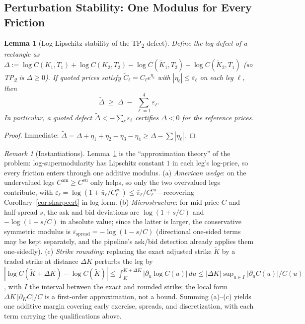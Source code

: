 \documentclass[11pt]{article}
\newtheorem{lemma}{Lemma}
\theoremstyle{remark}
\newtheorem{remark}{Remark}
\newcommand{\Kt}[1]{\tilde K_{#1}}
\begin{document}
\subsection{Perturbation Stability: One Modulus for Every Friction}

\begin{lemma}[Log-Lipschitz stability of the TP\textsubscript{2} defect]\label{lem:stability}
Define the log-defect of a rectangle as $\Delta:=\log C(K_1,T_1)+\log C(K_2,T_2)-\log C(\Kt1,T_2)-\log C(\Kt2,T_1)$ (so TP\textsubscript{2} is $\Delta\ge0$). If quoted prices satisfy $\tilde C_\ell=C_\ell e^{\eta_\ell}$ with $|\eta_\ell|\le\varepsilon_\ell$ on each leg $\ell$, then
\[
\tilde\Delta\;\ge\;\Delta\;-\;\sum_{\ell=1}^4\varepsilon_\ell .
\]
In particular, a quoted defect $\tilde\Delta<-\sum_\ell\varepsilon_\ell$ certifies $\Delta<0$ for the reference prices.
\end{lemma}
\begin{proof}
Immediate: $\tilde\Delta=\Delta+\eta_1+\eta_2-\eta_3-\eta_4\ge\Delta-\sum|\eta_\ell|$.
\end{proof}

\begin{remark}[Instantiations]\label{rem:instantiations}
Lemma~\ref{lem:stability} is the ``approximation theory'' of the problem: log-supermodularity has Lipschitz constant $1$ in each leg's log-price, so every friction enters through one additive modulus. (a) \emph{American wedge}: on the undervalued legs $C^{\mathrm{am}}\ge C^{\mathrm{eu}}$ only helps, so only the two overvalued legs contribute, with $\varepsilon_\ell=\log(1+\bar\pi_\ell/C^{\mathrm{eu}}_\ell)\le\bar\pi_\ell/C^{\mathrm{eu}}_\ell$---recovering Corollary~\ref{cor:sharpcert} in log form. (b) \emph{Microstructure}: for mid-price $C$ and half-spread $s$, the ask and bid deviations are $\log(1+s/C)$ and $-\log(1-s/C)$ in absolute value; since the latter is larger, the conservative symmetric modulus is $\varepsilon_{\mathrm{spread}}=-\log(1-s/C)$ (directional one-sided terms may be kept separately, and the pipeline's ask/bid detection already applies them one-sidedly). (c) \emph{Strike rounding}: replacing the exact adjusted strike $\tilde K$ by a traded strike at distance $\Delta K$ perturbs the leg by $|\log C(\tilde K+\Delta K)-\log C(\tilde K)|\le\int_{\tilde K}^{\tilde K+\Delta K}|\partial_u\log C(u)|\,du\le|\Delta K|\sup_{u\in I}|\partial_u C(u)|/C(u)$, with $I$ the interval between the exact and rounded strike; the local form $\Delta K\,|\partial_K C|/C$ is a first-order approximation, not a bound. Summing (a)--(c) yields one additive margin covering early exercise, spreads, and discretization, with each term carrying the qualifications above.
\end{remark}
\end{document}
